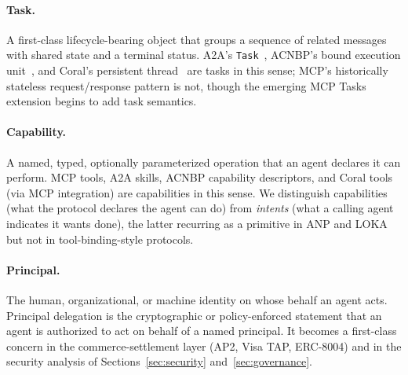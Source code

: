 \paragraph{Task.} A first-class lifecycle-bearing object that
groups a sequence of related messages with shared state and a
terminal status. A2A's \texttt{Task}~\cite{spec_a2a}, ACNBP's
bound execution unit~\cite{spec_acnbp}, and Coral's persistent
thread~\cite{spec_coral} are tasks in this sense; MCP's
historically stateless request/response pattern is not, though
the emerging MCP Tasks extension begins to add task semantics.

\paragraph{Capability.} A named, typed, optionally
parameterized operation that an agent declares it can perform.
MCP tools, A2A skills, ACNBP capability descriptors, and Coral
tools (via MCP integration) are capabilities in this sense.
We distinguish capabilities (what the protocol declares the
agent can do) from \emph{intents} (what a calling agent
indicates it wants done), the latter recurring as a primitive
in ANP and LOKA but not in tool-binding-style protocols.

\paragraph{Principal.} The human, organizational, or
machine identity on whose behalf an agent acts. Principal
delegation is the cryptographic or
policy-enforced statement that an agent is authorized to act
on behalf of a named principal. It becomes a first-class concern
in the commerce-settlement layer (AP2, Visa TAP, ERC-8004) and
in the security analysis of Sections~\ref{sec:security}
and~\ref{sec:governance}.
